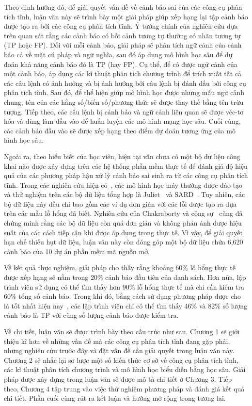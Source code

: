 Theo định hướng đó, để giải quyết vấn đề về cảnh báo sai của các công cụ phân tích tĩnh, luận văn này sẽ trình bày một giải pháp giúp xếp hạng lại tập cảnh báo được tạo ra bởi các công cụ phân tích tĩnh. Ý tưởng chính của nghiên cứu dựa trên quan sát rằng các cảnh báo có bối cảnh tương tự thường có nhãn tương tự (TP hoặc FP). Đối với mỗi cảnh báo, giải pháp sẽ phân tích ngữ cảnh của cảnh báo cả về mặt cú pháp và ngữ nghĩa, sau đó áp dụng mô hình học sâu để dự đoán khả năng cảnh báo đó là TP (hay FP). Cụ thể, để có được ngữ cảnh của một cảnh báo, \tool áp dụng các kĩ thuật phân tích chương trình để trích xuất tất cả các câu lệnh có ảnh hưởng và bị ảnh hưởng bởi câu lệnh bị đánh dấu bởi công cụ phân tích tĩnh. Sau đó, để thể hiện giúp mô hình học được những mẫu ngữ cảnh chung, tên của các hằng số/biến số/phương thức sẽ được thay thế bằng tên trừu tượng. Tiếp theo, các câu lệnh bị cảnh báo và ngữ cảnh liên quan sẽ được véc-tơ hóa và dùng làm đầu vào để huấn luyện các mô hình mạng học sâu. Cuối cùng, các cảnh báo đầu vào sẽ được xếp hạng theo điểm dự đoán tương ứng của mô hình học sâu.

Ngoài ra, theo hiểu biết của học viên, hiện tại vẫn chưa có một bộ dữ liệu công khai nào được xây dựng trên các hệ thống phần mềm thực tế để đánh giá độ hiệu quả của các phương pháp hậu xử lý cảnh báo sai sinh ra từ các công cụ phân tích tĩnh. Trong các nghiên cứu hiện có~\cite{flynn2018prioritizing, berman2019active}, các mô hình học máy thường được đào tạo và thử nghiệm trên các bộ dữ liệu tổng hợp là Juliet~\cite{JULIET} và SARD~\cite{SARD}. Tuy nhiên, các bộ dữ liệu này đều chỉ bao gồm các ví dụ đơn giản với các lỗi được tạo ra dựa trên các mẫu lỗ hổng đã biết. Nghiên cứu của Chakraborty và cộng sự~\cite{chakraborty2021deep} cũng đã chứng minh rằng các bộ dữ liệu còn quá đơn giản và không phản ánh được hiệu suất của các cách tiếp cận khi được áp dụng trong thực tế. Vì vậy, để giải quyết hạn chế thiếu hụt dữ liệu, luận văn này còn đóng góp một bộ dữ liệu chứa 6,620 cảnh báo của 10 dự án phần mềm mã nguồn mở.

Về kết quả thực nghiệm, giải pháp \tool cho thấy rằng khoảng 60\% lỗ hổng thực tế được \tool xếp hạng sẽ nằm trong 20\% cảnh báo đầu tiên của danh sách. Hơn nữa, lập trình viên sử dụng \tool có thể tìm thấy hơn 90\% lỗ hổng thực tế mà chỉ cần kiểm tra 60\% tổng số cảnh báo. Trong khi đó, bằng cách sử dụng phương pháp được cho là tốt nhất hiện nay~\cite{lee2019classifying}, các lập trình viên chỉ có thể tìm thấy 46\% và 82\% số lượng cảnh báo là TP với cùng số lượng cảnh báo được kiểm tra.

Về chi tiết, luận văn sẽ được trình bày theo cấu trúc như sau. Chương 1 sẽ giới thiệu kĩ hơn về những vấn đề mà các công cụ phân tích tĩnh đang gặp phải, những nghiên cứu trước đây và đặt vấn đề cần giải quyết trong luận văn này. Chương 2 sẽ nhắc lại sơ lược một số kiến thức cơ sở về công cụ phân tích tĩnh, các kĩ thuật phân tích chương trình và mô hình học biểu diễn bằng học sâu. Giải pháp được xây dựng trong luận văn sẽ được mô tả chi tiết ở Chương 3. Tiếp theo, Chương 4 tập trung vào việc thử nghiệm phương pháp và đánh giá kết quả chi tiết. Phần cuối cùng rút ra kết luận và hướng mở rộng trong tương lai.

\cleardoublepage